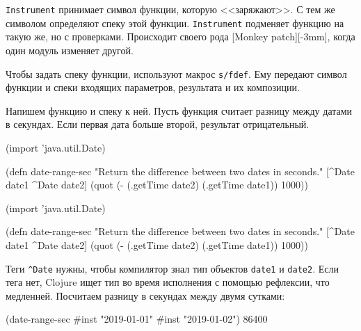
\verb|Instrument| принимает символ функции, которую <<заряжают>>. С тем же
символом определяют спеку этой функции. \verb|Instrument| подменяет функцию на
такую же, но с проверками. Происходит своего рода [Monkey patch][-3mm], когда
один модуль изменяет другой.

Чтобы задать спеку функции, используют макрос \verb|s/fdef|. Ему передают символ
функции и спеки входящих параметров, результата и их композиции.


Напишем функцию и спеку к ней. Пусть функция считает разницу между датами в
секундах. Если первая дата больше второй, результат отрицательный.

\ifx\DEVICETYPE\MOBILE

\begin{english}
  \begin{clojure}
(import 'java.util.Date)

(defn date-range-sec
  "Return the difference
           between two dates in seconds."
  [^Date date1 ^Date date2]
  (quot (- (.getTime date2)
           (.getTime date1))
        1000))
  \end{clojure}
\end{english}

\else

\begin{english}
  \begin{clojure}
(import 'java.util.Date)

(defn date-range-sec
  "Return the difference between two dates in seconds."
  [^Date date1 ^Date date2]
  (quot (- (.getTime date2)
           (.getTime date1))
        1000))
  \end{clojure}
\end{english}

\fi

Теги \verb|^Date| нужны, чтобы компилятор знал тип объектов \verb|date1| и
\verb|date2|. Если тега нет, Clojure ищет тип во время исполнения с помощью
рефлексии, что медленней. Посчитаем разницу в секундах между двумя сутками:

\ifx\DEVICETYPE\MOBILE

\begin{english}
  \begin{clojure}
(date-range-sec #inst "2019-01-01"
                #inst "2019-01-02")
86400
  \end{clojure}
\end{english}

